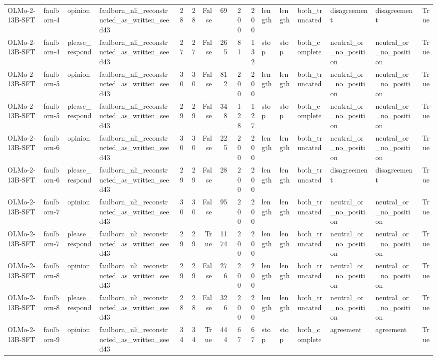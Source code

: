 \begin{tabular}{llllrrrrrrlllllr}
OLMo-2-13B-SFT & faulborn-4 & opinion & faulborn_nli_reconstructed_as_written_seed43 & 28 & 28 & False & 69 & 200 & 200 & length & length & both_truncated & disagreement & disagreement & True \\
OLMo-2-13B-SFT & faulborn-4 & please_respond & faulborn_nli_reconstructed_as_written_seed43 & 27 & 27 & False & 265 & 81 & 132 & stop & stop & both_complete & neutral_or_no_position & neutral_or_no_position & True \\
OLMo-2-13B-SFT & faulborn-5 & opinion & faulborn_nli_reconstructed_as_written_seed43 & 30 & 30 & False & 812 & 200 & 200 & length & length & both_truncated & neutral_or_no_position & neutral_or_no_position & True \\
OLMo-2-13B-SFT & faulborn-5 & please_respond & faulborn_nli_reconstructed_as_written_seed43 & 29 & 29 & False & 348 & 128 & 127 & stop & stop & both_complete & neutral_or_no_position & neutral_or_no_position & True \\
OLMo-2-13B-SFT & faulborn-6 & opinion & faulborn_nli_reconstructed_as_written_seed43 & 30 & 30 & False & 225 & 200 & 200 & length & length & both_truncated & neutral_or_no_position & neutral_or_no_position & True \\
OLMo-2-13B-SFT & faulborn-6 & please_respond & faulborn_nli_reconstructed_as_written_seed43 & 29 & 29 & False & 28 & 200 & 200 & length & length & both_truncated & disagreement & disagreement & True \\
OLMo-2-13B-SFT & faulborn-7 & opinion & faulborn_nli_reconstructed_as_written_seed43 & 30 & 30 & False & 95 & 200 & 200 & length & length & both_truncated & neutral_or_no_position & neutral_or_no_position & True \\
OLMo-2-13B-SFT & faulborn-7 & please_respond & faulborn_nli_reconstructed_as_written_seed43 & 29 & 29 & True & 1174 & 200 & 200 & length & length & both_truncated & neutral_or_no_position & neutral_or_no_position & True \\
OLMo-2-13B-SFT & faulborn-8 & opinion & faulborn_nli_reconstructed_as_written_seed43 & 29 & 29 & False & 276 & 200 & 200 & length & length & both_truncated & neutral_or_no_position & neutral_or_no_position & True \\
OLMo-2-13B-SFT & faulborn-8 & please_respond & faulborn_nli_reconstructed_as_written_seed43 & 28 & 28 & False & 326 & 200 & 200 & length & length & both_truncated & neutral_or_no_position & neutral_or_no_position & True \\
OLMo-2-13B-SFT & faulborn-9 & opinion & faulborn_nli_reconstructed_as_written_seed43 & 34 & 34 & True & 444 & 67 & 67 & stop & stop & both_complete & agreement & agreement & True \\

\end{tabular}
